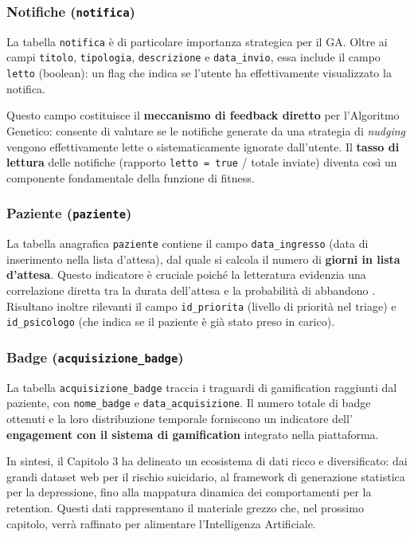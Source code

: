 \subsubsection{Notifiche (\texttt{notifica})}

La tabella \texttt{notifica} è di particolare importanza strategica per il GA. Oltre ai campi \texttt{titolo}, \texttt{tipologia}, \texttt{descrizione} e \texttt{data\_invio}, essa include il campo \texttt{letto} (boolean): un flag che indica se l'utente ha effettivamente visualizzato la notifica.

Questo campo costituisce il \textbf{meccanismo di feedback diretto} per l'Algoritmo Genetico: consente di valutare se le notifiche generate da una strategia di \textit{nudging} vengono effettivamente lette o sistematicamente ignorate dall'utente. Il \textbf{tasso di lettura} delle notifiche (rapporto \texttt{letto = true} / totale inviate) diventa così un componente fondamentale della funzione di fitness.

\subsubsection{Paziente (\texttt{paziente})}

La tabella anagrafica \texttt{paziente} contiene il campo \texttt{data\_ingresso} (data di inserimento nella lista d'attesa), dal quale si calcola il numero di \textbf{giorni in lista d'attesa}. Questo indicatore è cruciale poiché la letteratura evidenzia una correlazione diretta tra la durata dell'attesa e la probabilità di abbandono \cite{baumel2019mhealth}. Risultano inoltre rilevanti il campo \texttt{id\_priorita} (livello di priorità nel triage) e \texttt{id\_psicologo} (che indica se il paziente è già stato preso in carico).

\subsubsection{Badge (\texttt{acquisizione\_badge})}

La tabella \texttt{acquisizione\_badge} traccia i traguardi di gamification raggiunti dal paziente, con \texttt{nome\_badge} e \texttt{data\_acquisizione}. Il numero totale di badge ottenuti e la loro distribuzione temporale forniscono un indicatore dell' \textbf{engagement con il sistema di gamification} integrato nella piattaforma.

In sintesi, il Capitolo 3 ha delineato un ecosistema di dati ricco e diversificato: dai grandi dataset web per il rischio suicidario, al framework di generazione statistica per la depressione, fino alla mappatura dinamica dei comportamenti per la retention. Questi dati rappresentano il materiale grezzo che, nel prossimo capitolo, verrà raffinato per alimentare l'Intelligenza Artificiale.
